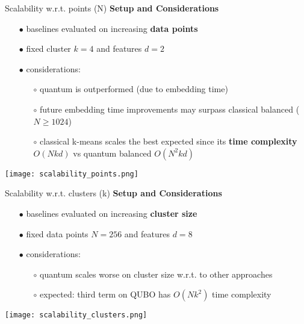		\begin{frame}[allowframebreaks]{Scalability w.r.t. points (N)}
			\textbf{Setup and Considerations}
			\begin{itemize}
				\item[$\bullet$] baselines evaluated on increasing \textbf{data points}
				\item[$\bullet$] fixed cluster $k=4$ and features $d=2$
				\item[$\bullet$] considerations:
				\begin{itemize}
					\item[$\circ$] quantum is outperformed (due to embedding time)
					\item[$\circ$] future embedding time improvements may surpass classical balanced ($N \geq 1024$)
					\item[$\circ$] classical k-means scales the best expected since its \textbf{time complexity} $O(Nkd)$ vs quantum balanced $O(N^2kd)$ 
				\end{itemize} 
			\end{itemize}
			\begin{center}
				\texttt{[image: scalability\_points.png]}
			\end{center}		
		\end{frame}

		\begin{frame}[allowframebreaks]{Scalability w.r.t. clusters (k)}
			\textbf{Setup and Considerations}
			\begin{itemize}
				\item[$\bullet$] baselines evaluated on increasing \textbf{cluster size}
				\item[$\bullet$] fixed data points $N=256$ and features $d=8$
				\item[$\bullet$] considerations:
				\begin{itemize}
					\item[$\circ$] quantum scales worse on cluster size w.r.t. to other approaches
					\item[$\circ$] expected: third term on QUBO has $O(Nk^2)$ time complexity
				\end{itemize} 
			\end{itemize}
			\begin{center}
				\texttt{[image: scalability\_clusters.png]}
			\end{center}
		\end{frame}

